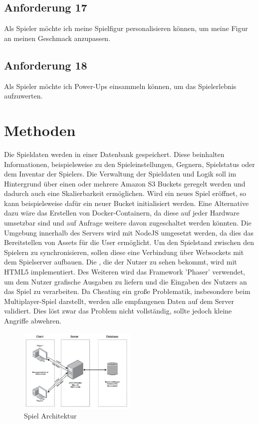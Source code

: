 \documentclass[conference]{IEEEtran}
\begin{document}
\subsection{Anforderung 17}
Als Spieler möchte ich meine Spielfigur personalisieren können, um meine Figur an meinen Geschmack anzupassen.

\subsection{Anforderung 18}
Als Spieler möchte ich Power-Ups einsammeln können, um das Spielerlebnis aufzuwerten.

\section{Methoden}
Die Spieldaten werden in einer Datenbank gespeichert.
Diese beinhalten Informationen, beispielsweise zu den Spieleinstellungen, Gegnern, Spielstatus oder dem Inventar der Spielers. 
Die Verwaltung der Spieldaten und Logik soll im Hintergrund über einen oder mehrere Amazon S3 Buckets geregelt werden und dadurch auch eine Skalierbarkeit ermöglichen. Wird ein neues Spiel eröffnet, so kann beispielsweise dafür ein neuer Bucket initialisiert werden. 
Eine Alternative dazu wäre das Erstellen von Docker-Containern, da diese auf jeder Hardware umsetzbar sind und auf Anfrage weitere davon zugeschaltet werden könnten. Die Umgebung innerhalb des Servers wird mit NodeJS umgesetzt werden, da dies das Bereitstellen von Assets für die User ermöglicht. Um den Spielstand zwischen den Spielern zu synchronisieren, sollen diese eine Verbindung über Websockets mit dem Spielserver aufbauen.
Die , 
die der Nutzer zu sehen bekommt, wird mit HTML5 implementiert. Des Weiteren wird das Framework 'Phaser' verwendet, um dem Nutzer grafische Ausgaben zu liefern und die Eingaben des Nutzers an das Spiel zu verarbeiten.
Da Cheating ein große Problematik, insbesondere beim Multiplayer-Spiel darstellt, werden alle empfangenen Daten auf dem Server validiert. Dies löst zwar das Problem nicht vollständig, sollte jedoch kleine Angriffe abwehren. 
\begin{figure}[H]
    \centering
    \includegraphics[width=0.5\textwidth]{res/game_arch.png}
    \caption{Spiel Architektur}
\end{figure}
\end{document}
